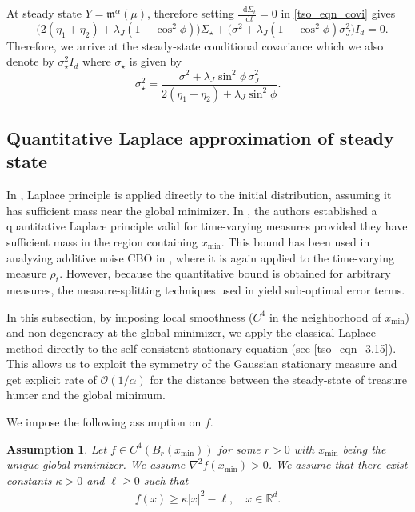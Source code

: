 \documentclass{article}
\def\m{\mathfrak{m}}
\newcommand*\der{\mathop{}\!\mathrm{d}}
\numberwithin{equation}{section}
\newtheorem{assumption}{Assumption}
\begin{document}
At steady state $Y = \m^\alpha(\mu)$, therefore setting $\frac{\der \Sigma_t}{\der t} = 0$ in \eqref{tso_eqn_covi} gives
\begin{equation}
 -\bigl(2(\eta_1+\eta_2) + \lambda_J(1-\cos^2\phi)\bigr) \Sigma_\star + \bigl(\sigma^2 + \lambda_J(1-\cos^2\phi)\sigma_J^2\bigr)I_d = 0.
\label{eq:var_ODE}
\end{equation}
Therefore, we arrive at the steady-state conditional covariance which we also denote by $\sigma_\star^2 I_d$  where $\sigma_\star$ is given by
\begin{equation}
\sigma_\star^2 = \frac{\sigma^2 + \lambda_J \sin^2\phi\,\sigma_J^2}{2(\eta_1+\eta_2) + \lambda_J \sin^2\phi}.
\label{eq:steady_var}
\end{equation}


\subsection{Quantitative Laplace approximation of steady state}\label{tso_sec_quant_laplace_approx}
 In \cite{carrillo2018analytical}, Laplace principle is applied directly to the initial distribution, assuming it has sufficient mass near the global minimizer. In \cite{fornasier_klock_riedl2024consensus}, the authors established a  quantitative Laplace principle valid for time-varying measures provided they have sufficient mass in the region containing $x_{\min}$. This bound has been used in analyzing additive noise CBO in \cite{additive_CBO_2026}, where it is again applied to the time-varying measure $\rho_t$. However, because the quantitative bound is obtained for arbitrary measures, the measure-splitting techniques used in \cite{fornasier_klock_riedl2024consensus} yield sub-optimal error terms. 
 
 In this subsection, by imposing local smoothness ($C^4$ in the neighborhood of $x_{\min}$) and non-degeneracy at the global minimizer, we apply the classical Laplace method directly to the self-consistent stationary equation (see \eqref{tso_eqn_3.15}). This allows us to exploit the symmetry of the Gaussian stationary measure and get explicit rate of $\mathcal{O}(1/\alpha)$ for the distance between the steady-state of treasure hunter and the global minimum.

We impose the following assumption on $f$.

\begin{assumption}\label{tso_assum_2}
   Let $f \in C^{4}(B_r(x_{\min}))$ for some $r > 0$ with $x_{\min}$ being the unique global minimizer. We assume $\nabla^2 f(x_{\min}) > 0$. We assume that there exist constants $\kappa > 0$ and  $\ell \geq 0 $ such that 
   \begin{align}\label{tso_eqn_coerc_assum}
       f(x) \geq \kappa |x|^2 - \ell, \quad  x \in \mathbb{R}^{d}.
   \end{align}
\end{assumption}
\end{document}
